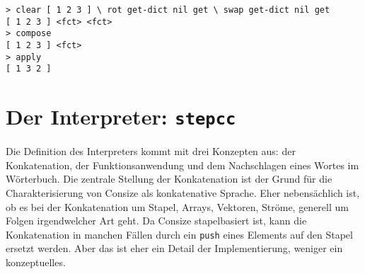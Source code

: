 \begin{verbatim}
> clear [ 1 2 3 ] \ rot get-dict nil get \ swap get-dict nil get
[ 1 2 3 ] <fct> <fct>
> compose
[ 1 2 3 ] <fct>
> apply
[ 1 3 2 ]
\end{verbatim}

\section{Der Interpreter: \texttt{stepcc}}

Die Definition des Interpreters kommt mit drei Konzepten aus: der Konkatenation, der Funktionsanwendung und dem Nachschlagen eines Wortes im Wörterbuch. Die zentrale Stellung der Konkatenation ist der Grund für die Charakterisierung von Consize als konkatenative Sprache. Eher nebensächlich ist, ob es bei der Konkatenation um Stapel, Arrays, Vektoren, Ströme, generell um Folgen irgendwelcher Art geht. Da Consize stapelbasiert ist, kann die Konkatenation in manchen Fällen durch ein \verb|push| eines Elements auf den Stapel ersetzt werden. Aber das ist eher ein Detail der Implementierung, weniger ein konzeptuelles.

